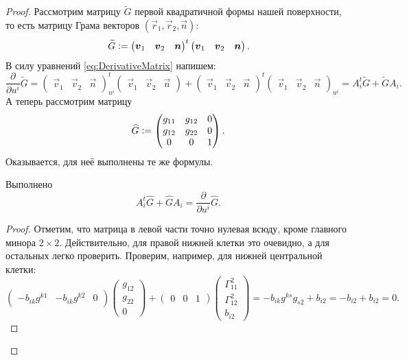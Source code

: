 \begin{proof}
	Рассмотрим матрицу $\widetilde{G}$ первой квадратичной формы нашей поверхности, то есть матрицу Грама векторов $(\vec{r}_1, \vec{r}_2, \vec{n})$:
	\[
		\widetilde{G} \vcentcolon =
		\begin{pmatrix}
			\vec{v}_1 & \vec{v}_2 & \vec{n}
		\end{pmatrix}^t
		\begin{pmatrix}
			\vec{v}_1 & \vec{v}_2 & \vec{n}
		\end{pmatrix}.
	\]
	В силу уравнений \eqref{eq:DerivativeMatrix} напишем:
	\[
		\frac{\partial}{\partial u^i}\widetilde{G} = 
		\begin{pmatrix}
			\vec{v}_1 & \vec{v}_2 & \vec{n}
		\end{pmatrix}^t_{u^i}
		\begin{pmatrix}
			\vec{v}_1 & \vec{v}_2 & \vec{n}
		\end{pmatrix} + 
		\begin{pmatrix}
			\vec{v}_1 & \vec{v}_2 & \vec{n}
		\end{pmatrix}^t
		\begin{pmatrix}
			\vec{v}_1 & \vec{v}_2 & \vec{n}
		\end{pmatrix}_{u^i} = A_i^t\widetilde{G} + \widetilde{G}A_i.
	\]
	А теперь рассмотрим матрицу
	\[
		\widehat{G} \vcentcolon =
		\begin{pmatrix}
			g_{11} & g_{12} & 0\\
			g_{12} & g_{22} & 0\\
			0 & 0 & 1
		\end{pmatrix}.
	\]
	Оказывается, для неё выполнены те же формулы.

	\begin{lemma} \label{lemma:Gui}
		Выполнено
		\[
			A_i^t\widehat{G} + \widehat{G}A_i = \frac{\partial}{\partial u^i}\widehat{G}.
		\]
	\end{lemma}

	\begin{proof}
		Отметим, что матрица в левой части точно нулевая всюду, кроме главного минора $2 \times 2$. Действительно, для правой нижней клетки это очевидно, а для остальных легко проверить. Проверим, например, для нижней центральной клетки:
		\[
			\begin{pmatrix}
				-b_{ik}g^{k1} & -b_{ik}g^{k2} & 0
			\end{pmatrix}
			\begin{pmatrix}
				g_{12}\\
				g_{22}\\
				0
			\end{pmatrix} +
			\begin{pmatrix}
				0 & 0 & 1
			\end{pmatrix}
			\begin{pmatrix}
				\Gamma_{11}^2\\
				\Gamma_{12}^2\\
				b_{i2}
			\end{pmatrix} = -b_{ik}g^{ks}g_{s2} + b_{i2} = -b_{i2} + b_{i2} = 0.
		\]
		

\end{proof}
\end{proof}
